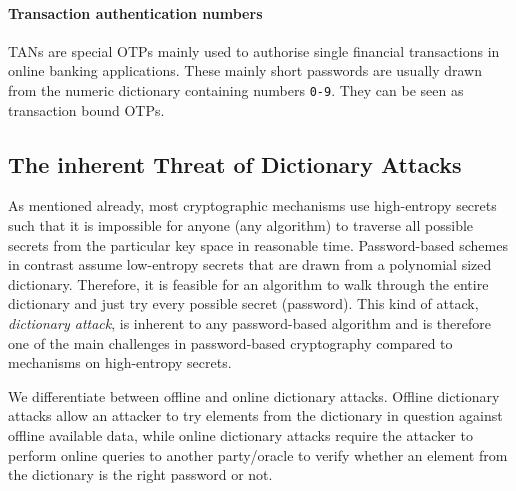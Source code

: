 \paragraph{Transaction authentication numbers}
\acp{TAN} are special \acp{OTP} mainly used to authorise single financial transactions in online banking applications.
These mainly short passwords are usually drawn from the numeric dictionary containing numbers \texttt{0-9}.
They can be seen as transaction bound \acp{OTP}.


\subsection{The inherent Threat of Dictionary Attacks}\label{sec:introdictionaryattacks}
As mentioned already, most cryptographic mechanisms use high-entropy secrets such that it is impossible for anyone (any algorithm) to traverse all possible secrets from the particular key space in reasonable time.
Password-based schemes in contrast assume low-entropy secrets that are drawn from a polynomial sized dictionary.
Therefore, it is feasible for an algorithm to walk through the entire dictionary and just try every possible secret (password).
This kind of attack, \emph{dictionary attack}, is inherent to any password-based algorithm and is therefore one of the main challenges in password-based cryptography compared to mechanisms on high-entropy secrets.

We differentiate between offline and online dictionary attacks.
Offline dictionary attacks allow an attacker to try elements from the dictionary in question against offline available data, while online dictionary attacks require the attacker to perform online queries to another party/oracle to verify whether an element from the dictionary is the right password or not.

